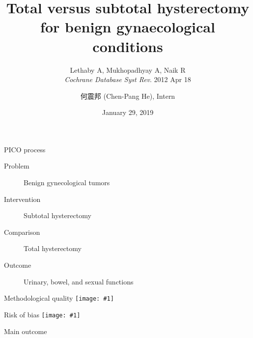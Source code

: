 \documentclass{beamer}
\title[Hysterectomy]{Total versus subtotal hysterectomy for benign gynaecological conditions}
\subtitle{
    Lethaby A, Mukhopadhyay A, Naik R \\
    \textit{Cochrane Database Syst Rev}.  2012 Apr 18
}
\author[Chen-Pang He]{何震邦 (Chen-Pang He), Intern}
\institute[CGH]{Cathay General Hospital}
\date{January 29, 2019}
\newcommand*{\solo}[1]{\centering\texttt{[image: \#1]}}
\begin{document}
\maketitle

\begin{frame}{PICO process}
    \begin{description}
        \item[Problem]      Benign gynecological tumors
        \item[Intervention] Subtotal hysterectomy
        \item[Comparison]   Total hysterectomy
        \item[Outcome]      Urinary, bowel, and sexual functions
    \end{description}
\end{frame}

\begin{frame}{Methodological quality}
    \solo{F1.png}
\end{frame}

\begin{frame}{Risk of bias}
    \solo{F2.png}
\end{frame}

\begin{frame}{Main outcome}
    \only<1>{\solo{T1.eps}}
    \only<2>{\solo{T2.eps}}
\end{frame}
\end{document}
